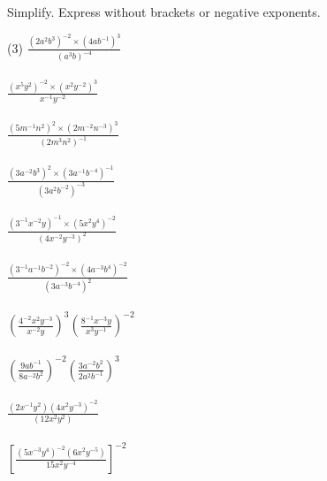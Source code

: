 \documentclass[12pt,fleqn]{book}
\newcommand{\prb}[1]{\begin{Exercise}#1\end{Exercise}}
\begin{document}
\prb{
Simplify. Express without brackets or negative exponents.\\
\begin{tasks}(3)
\task $\displaystyle \frac{\left(2 a^{2} b^{3}\right)^{-2} \times\left(4 a b^{-1}\right)^{3}}{\left(a^{3} b\right)^{-4}}$\\
\\[1in]
\task $\displaystyle\frac{\left(x^{5} y^{2}\right)^{-2} \times\left(x^{2} y^{-2}\right)^{3}}{x^{-1} y^{-2}}$\\
\\[1in]
\task $\displaystyle\frac{\left(5 m^{-1} n^{2}\right)^{2} \times\left(2 m^{-2} n^{-3}\right)^{3}}{\left(2 m^{3} n^{2}\right)^{-1}}$\\
\\[1in]
\task $\displaystyle\frac{\left(3 a^{-2} b^{3}\right)^{2} \times\left(3 a^{-1} b^{-4}\right)^{-1}}{\left(3 a^{2} b^{-2}\right)^{-3}}$\\
\\[1in]
\task $\displaystyle\frac{\left(3^{-1} x^{-2} y\right)^{-1} \times\left(5 x^{2} y^{4}\right)^{-2}}{\left(4 x^{-2} y^{-3}\right)^{2}}$\\
\\[1in]
\task $\displaystyle\frac{\left(3^{-1} a^{-1} b^{-2}\right)^{-2} \times\left(4 a^{-3} b^{4}\right)^{-2}}{\left(3 a^{-3} b^{-4}\right)^{2}}$\\
\\[1in]
\task $\displaystyle\left(\frac{4^{-2} x^{2} y^{-3}}{x^{-2} y}\right)^{3}\left(\frac{8^{-1} x^{-3} y}{x^{3} y^{-1}}\right)^{-2}$\\
\\[1in]
\task $\displaystyle\left(\frac{9 a b^{-1}}{8 a^{-2} b^{2}}\right)^{-2}\left(\frac{3 a^{-2} b^{2}}{2 a^{2} b^{-1}}\right)^{3}$\\
\\[1in]
\task $\displaystyle\frac{\left(2 x^{-1} y^{2}\right)\left(4 x^{2} y^{-3}\right)^{-2}}{\left(12 x^{2} y^{2}\right)}$\\
\\[1in]
\task $\displaystyle\left[\frac{\left(5 x^{-3} y^{4}\right)^{-2}\left(6 x^{2} y^{-5}\right)}{15 x^{2} y^{-4}}\right]^{-2}$
\\[1in]
\end{tasks}
}
\end{document}

